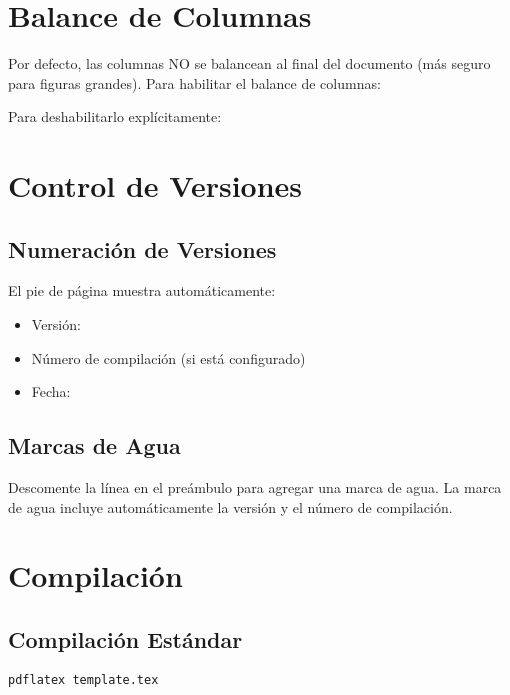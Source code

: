 \documentclass{pt-article}
\begin{document}
\section{Balance de Columnas}

Por defecto, las columnas NO se balancean al final del documento (más seguro
para figuras grandes). Para habilitar el balance de columnas:


Para deshabilitarlo explícitamente:


\section{Control de Versiones}

\subsection{Numeración de Versiones}

El pie de página muestra automáticamente:
\begin{itemize}
    \item Versión: \docversion
    \item Número de compilación (si está configurado)
    \item Fecha: \todayymd
\end{itemize}

\subsection{Marcas de Agua}

Descomente la línea  en el
preámbulo para agregar una marca de agua. La marca de agua incluye
automáticamente la versión y el número de compilación.

\section{Compilación}

\subsection{Compilación Estándar}

\begin{verbatim}
pdflatex template.tex
\end{verbatim}
\end{document}
